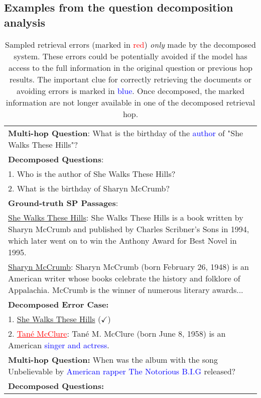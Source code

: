 \clearpage

\subsection{Examples from the question decomposition analysis}
\label{appendix:decomposed_exmaples}
\begin{table*}[h]
    \centering
    \caption{Sampled retrieval errors (marked in \textcolor{red}{red}) \textit{only} made by the decomposed system. These errors could be potentially avoided if the model has access to the full information in the original question or previous hop results. The important clue for correctly retrieving the documents or avoiding errors is marked in \textcolor{blue}{blue}. Once decomposed, the marked information are not longer available in one of the decomposed retrieval hop.}
    \begin{tabular}{p{}}
    \toprule
     \textbf{Multi-hop Question}:  What is the birthday of the \textcolor{blue}{author} of "She Walks These Hills"?\\
     \textbf{Decomposed Questions}:\\
     1. Who is the author of She Walks These Hills?\\
     2. What is the birthday of Sharyn McCrumb?\\
     \textbf{Ground-truth SP Passages}: \\
     \underline{She Walks These Hills}: She Walks These Hills is a book written by Sharyn McCrumb and published by Charles Scribner's Sons in 1994, which later went on to win the Anthony Award for Best Novel in 1995.\\
     \underline{Sharyn McCrumb}: Sharyn McCrumb (born February 26, 1948) is an American writer whose books celebrate the history and folklore of Appalachia. McCrumb is the winner of numerous literary awards... \\
     \textbf{Decomposed Error Case:} \\
     1. \underline{She Walks These Hills} ($\checkmark$)\\
     2. \textcolor{red}{\underline{Tané McClure}}: Tané M. McClure (born June 8, 1958) is an American \textcolor{blue}{singer and actress}. \\
     \midrule
    \textbf{Multi-hop Question:} When was the album with the song Unbelievable by \textcolor{blue}{American rapper The Notorious B.I.G} released? \\
    \textbf{Decomposed Questions:} \\

\end{tabular}
\end{table*}
